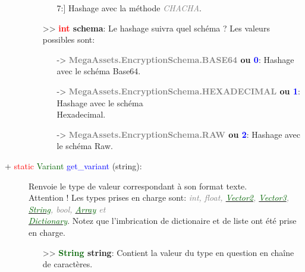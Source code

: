 \documentclass[a4paper, 11pt]{article}
\begin{document}
\begin{description}
\begin{itemize}
\begin{itemize}
{				{7}}:] Hashage avec la méthode \textit{\textcolor{gray}{CHACHA}}.
			\end{itemize}
			\item [>> \textbf{\textcolor{red}{int} schema}:] Le hashage suivra quel schéma ? Les valeurs 
			possibles sont:
			\begin{itemize}
				\item [-> \textbf{\textcolor{gray}{MegaAssets.EncryptionSchema.BASE64} ou \textcolor{blue}
				{0}}:] Hashage avec le schéma Base64.
				\item [-> \textbf{\textcolor{gray}{MegaAssets.EncryptionSchema.HEXADECIMAL} ou 
				\textcolor{blue}{1}}:] Hashage avec le schéma \\Hexadecimal.
				\item [-> \textbf{\textcolor{gray}{MegaAssets.EncryptionSchema.RAW} ou \textcolor{blue}
				{2}}:] Hashage avec le schéma Raw.\\
			\end{itemize}
		\end{itemize}
	\end{description}
	\newpage \begin{description}
		\item [+ \textcolor{red}{static} \textcolor{darkgreen}{Variant} \textcolor{blue}{get\_variant} 
		(string):] Renvoie le type de valeur correspondant à son format texte. \\Attention ! Les types 
		prises en charge sont: \textit{\textcolor{gray}{int, float,
		\href{https://docs.godotengine.org/fr/stable/classes/class_vector2.html}{\textcolor{darkgreen}
		{Vector2}},
		\href{https://docs.godotengine.org/fr/stable/classes/class_vector3.html}{\textcolor{darkgreen}
		{Vector3}},
		\href{https://docs.godotengine.org/fr/stable/classes/class_string.html}{\textcolor{darkgreen}
		{String}}, bool, \href{https://docs.godotengine.org/fr/stable/classes/class_array.html}
		{\textcolor{darkgreen}{Array}} et
		\href{https://docs.godotengine.org/fr/stable/classes/class_dictionary.html}{\textcolor{darkgreen}
		{\\Dictionary}}}}. Notez que l'imbrication de dictionaire et de liste ont été prise en charge.
		\begin{itemize}
			\item [>> \textbf{\textcolor{darkgreen}{String} string}:] Contient la valeur du type en question 
			en chaîne de caractères.\\
		\end{itemize}
	\end{description}
\end{document}

